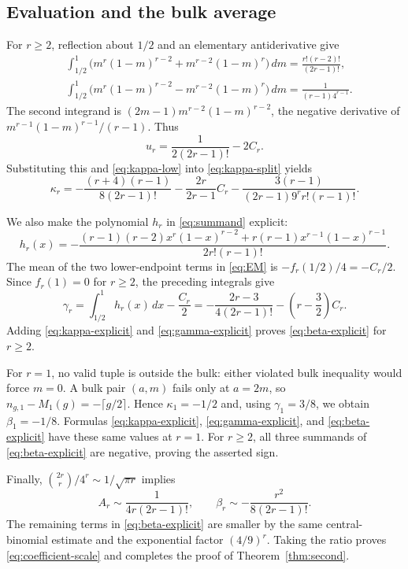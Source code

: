 \documentclass[11pt]{article}
\theoremstyle{remark}\newtheorem{remark}[theorem]{Remark}
\begin{document}
\subsection{Evaluation and the bulk average}

For $r\ge2$, reflection about $1/2$ and an elementary antiderivative give
\begin{align*}
&\int_{1/2}^1\bigl(m^r(1-m)^{r-2}+m^{r-2}(1-m)^r\bigr)\,dm
 =\frac{r!(r-2)!}{(2r-1)!},\\
&\int_{1/2}^1\bigl(m^r(1-m)^{r-2}-m^{r-2}(1-m)^r\bigr)\,dm
 =\frac{1}{(r-1)4^{r-1}}.
\end{align*}
The second integrand is $(2m-1)m^{r-2}(1-m)^{r-2}$, the negative
derivative of $m^{r-1}(1-m)^{r-1}/(r-1)$. Thus
\[
u_r=\frac{1}{2(2r-1)!}-2C_r.
\]
Substituting this and \eqref{eq:kappa-low} into \eqref{eq:kappa-split}
yields
\begin{equation}\label{eq:kappa-explicit}
\kappa_r=-\frac{(r+4)(r-1)}{8(2r-1)!}
-\frac{2r}{2r-1}C_r
-\frac{3(r-1)}{(2r-1)9^r r!(r-1)!}.
\end{equation}

We also make the polynomial $h_r$ in \eqref{eq:summand} explicit:
\[
h_r(x)=-\frac{(r-1)(r-2)x^r(1-x)^{r-2}
 +r(r-1)x^{r-1}(1-x)^{r-1}}{2r!(r-1)!}.
\]
The mean of the two lower-endpoint terms in \eqref{eq:EM} is
$-f_r(1/2)/4=-C_r/2$. Since $f_r(1)=0$ for $r\ge2$, the preceding
integrals give
\begin{equation}\label{eq:gamma-explicit}
\gamma_r=\int_{1/2}^1h_r(x)\,dx-\frac{C_r}{2}
=-\frac{2r-3}{4(2r-1)!}-\left(r-\frac32\right)C_r.
\end{equation}
Adding \eqref{eq:kappa-explicit} and \eqref{eq:gamma-explicit} proves
\eqref{eq:beta-explicit} for $r\ge2$.

For $r=1$, no valid tuple is outside the bulk: either violated bulk inequality would force $m=0$. A bulk pair $(a,m)$ fails only at $a=2m$, so
$n_{g,1}-M_1(g)=-\lceil g/2\rceil$. Hence $\kappa_1=-1/2$ and,
using $\gamma_1=3/8$, we obtain $\beta_1=-1/8$. Formulas
\eqref{eq:kappa-explicit}, \eqref{eq:gamma-explicit}, and \eqref{eq:beta-explicit} have these same values
at $r=1$. For $r\ge2$, all three summands of \eqref{eq:beta-explicit}
are negative, proving the asserted sign.

Finally, $\binom{2r}{r}/4^r\sim1/\sqrt{\pi r}$ implies
\[
A_r\sim\frac{1}{4r(2r-1)!},\qquad
\beta_r\sim-\frac{r^2}{8(2r-1)!}.
\]
The remaining terms in \eqref{eq:beta-explicit} are smaller by the same
central-binomial estimate and the exponential factor $(4/9)^r$.
Taking the ratio proves \eqref{eq:coefficient-scale} and completes the
proof of Theorem~\ref{thm:second}.
\end{document}
